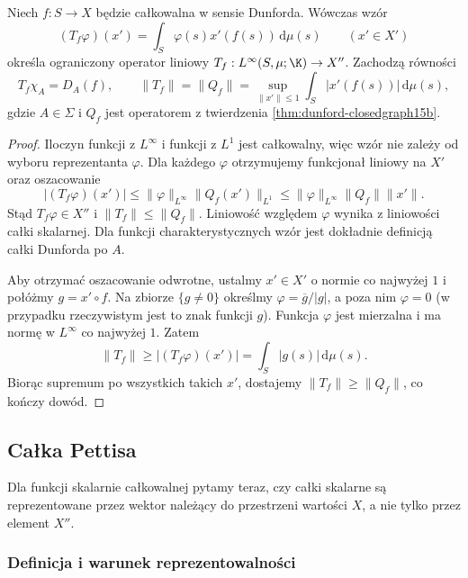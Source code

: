 \begin{twierdzenie}
\label{thm:dunford-integration-operator15b}
Niech $f:S\to X$ będzie całkowalna w sensie Dunforda.
Wówczas wzór
\[
 (T_f\varphi)(x')=\int_S\varphi(s)x'(f(s))\,\mathrm d\mu(s)
 \qquad(x'\in X')
\]
określa ograniczony operator liniowy
$T_f:L^\infty(S,\mu;\K)\to X''$. Zachodzą równości
\[
 T_f\chi_A=D_A(f),\qquad
 \|T_f\|=\|Q_f\|
 =\sup_{\|x'\|\le1}\int_S|x'(f(s))|\,\mathrm d\mu(s),
\]
gdzie $A\in\Sigma$ i $Q_f$ jest operatorem z twierdzenia
\ref{thm:dunford-closedgraph15b}.
\end{twierdzenie}
\begin{proof}
Iloczyn funkcji z $L^\infty$ i funkcji z $L^1$ jest
całkowalny, więc wzór nie zależy od wyboru reprezentanta
$\varphi$. Dla każdego $\varphi$ otrzymujemy funkcjonał
liniowy na $X'$ oraz oszacowanie
\[
 |(T_f\varphi)(x')|
 \le\|\varphi\|_{L^\infty}\|Q_f(x')\|_{L^1}
 \le\|\varphi\|_{L^\infty}\|Q_f\|\|x'\|.
\]
Stąd $T_f\varphi\in X''$ i $\|T_f\|\le\|Q_f\|$.
Liniowość względem $\varphi$ wynika z liniowości
całki skalarnej. Dla funkcji charakterystycznych wzór
jest dokładnie definicją całki Dunforda po $A$.

Aby otrzymać oszacowanie odwrotne, ustalmy $x'\in X'$
o normie co najwyżej $1$ i połóżmy $g=x'\circ f$.
Na zbiorze $\{g\ne0\}$ określmy
$\varphi=\overline g/|g|$, a poza nim $\varphi=0$
(w przypadku rzeczywistym jest to znak funkcji $g$).
Funkcja $\varphi$ jest mierzalna i ma normę w
$L^\infty$ co najwyżej $1$. Zatem
\[
 \|T_f\|\ge |(T_f\varphi)(x')|
 =\int_S|g(s)|\,\mathrm d\mu(s).
\]
Biorąc supremum po wszystkich takich $x'$, dostajemy
$\|T_f\|\ge\|Q_f\|$, co kończy dowód.
\end{proof}

\subsection{Całka Pettisa}

Dla funkcji skalarnie całkowalnej pytamy teraz, czy całki
skalarne są reprezentowane przez wektor należący do
przestrzeni wartości $X$, a nie tylko przez element $X''$.

\subsubsection{Definicja i warunek reprezentowalności}

